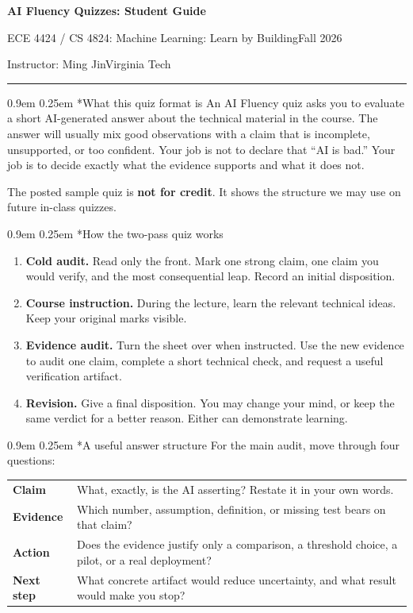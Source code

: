 \documentclass[10pt]{article}
\makeatletter
\newcommand{\CourseCodes}{ECE 4424 / CS 4824}
\newcommand{\CourseName}{Machine Learning: Learn by Building}
\newcommand{\CourseTerm}{Fall 2026}
\newcommand{\InstructorName}{Ming Jin}
\renewcommand\section{\@startsection{section}{1}{\z@}%
  {0.9em}%
  {0.25em}%
  {\normalfont\large\bfseries}}
\newcommand{\GuideHeader}{%
  {\LARGE\bfseries AI Fluency Quizzes: Student Guide}\par
  \vspace{0.25em}
  \CourseCodes: \CourseName\hfill\CourseTerm\par
  Instructor: \InstructorName\hfill Virginia Tech
  \vspace{0.4em}\hrule\vspace{0.55em}
}
\makeatother
\begin{document}
\GuideHeader

\section*{What this quiz format is}
An AI Fluency quiz asks you to evaluate a short AI-generated answer about the technical material in the course. The answer will usually mix good observations with a claim that is incomplete, unsupported, or too confident. Your job is not to declare that ``AI is bad.'' Your job is to decide exactly what the evidence supports and what it does not.

The posted sample quiz is \textbf{not for credit}. It shows the structure we may use on future in-class quizzes.

\section*{How the two-pass quiz works}
\begin{enumerate}
  \item \textbf{Cold audit.} Read only the front. Mark one strong claim, one claim you would verify, and the most consequential leap. Record an initial disposition.
  \item \textbf{Course instruction.} During the lecture, learn the relevant technical ideas. Keep your original marks visible.
  \item \textbf{Evidence audit.} Turn the sheet over when instructed. Use the new evidence to audit one claim, complete a short technical check, and request a useful verification artifact.
  \item \textbf{Revision.} Give a final disposition. You may change your mind, or keep the same verdict for a better reason. Either can demonstrate learning.
\end{enumerate}

\section*{A useful answer structure}
For the main audit, move through four questions:

\begin{tabularx}{\linewidth}{@{}p{0.95in}L@{}}
  \toprule
  \textbf{Claim} & What, exactly, is the AI asserting? Restate it in your own words. \\
  \textbf{Evidence} & Which number, assumption, definition, or missing test bears on that claim? \\
  \textbf{Action} & Does the evidence justify only a comparison, a threshold choice, a pilot, or a real deployment? \\
  \textbf{Next step} & What concrete artifact would reduce uncertainty, and what result would make you stop? \\
  \bottomrule
\end{tabularx}
\end{document}
